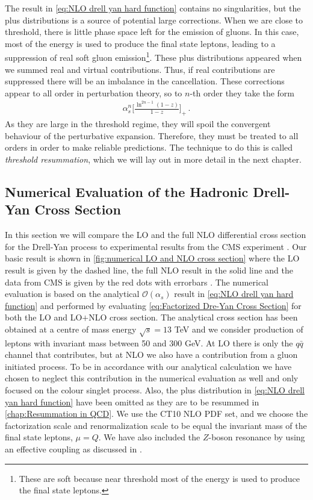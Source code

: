 The result in \cref{eq:NLO drell yan hard function} contains no singularities, but the plus distributions is a source of potential large corrections. When we are close to threshold, there is little phase space left for the emission of gluons. In this case, most of the energy is used to produce the final state leptons, leading to a suppression of real soft gluon emission\footnote{These are soft because near threshold most of the energy is used to produce the final state leptons.}. These plus distributions appeared when we summed real and virtual contributions. Thus, if real contributions are suppressed there will be an imbalance in the cancellation. These corrections appear to all order in perturbation theory, so to $n$-th order they take the form
\begin{align}
    \alpha_{s}^{n}\Big[\frac{\ln^{2n-1}(1-z)}{1-z}\Big]_{+}\,.
\end{align}
As they are large in the threshold regime, they will spoil the convergent behaviour of the perturbative expansion. Therefore, they must be treated to all orders in order to make reliable predictions. The technique to do this is called \emph{threshold resummation}, which we will lay out in more detail in the next chapter.


\subsection{Numerical Evaluation of the Hadronic Drell-Yan Cross Section}
In this section we will compare the LO and the full NLO differential cross section for the Drell-Yan process to experimental results from the CMS experiment \cite{Sirunyan:2018owv}. Our basic result is shown in \cref{fig:numerical LO and NLO cross section} where the LO result is given by the dashed line, the full NLO result in the solid line and the data from CMS is given by the red dots with errorbars \cite{Sirunyan:2018owv}. The numerical evaluation is based on the analytical $\mathcal{O}(\alpha_s)$ result in \cref{eq:NLO drell yan hard function} and performed by evaluating \cref{eq:Factorized Dre-Yan Cross Section} for both the LO and LO$+$NLO cross section. The analytical cross section has been obtained at a centre of mass energy $\sqrt{s}=13$ TeV and we consider production of leptons with invariant mass between 50 and 300 GeV. At LO there is only the $q\bar{q}$ channel that contributes, but at NLO we also have a contribution from a gluon initiated process. To be in accordance with our analytical calculation we have chosen to neglect this contribution in the numerical evaluation as well and only focused on the colour singlet process. Also, the plus distribution in \cref{eq:NLO drell yan hard function} have been omitted as they are to be resummed in \cref{chap:Resummation in QCD}. We use the CT10 NLO \cite{Lai:2010vv} PDF set, and we choose the factorization scale and renormalization scale to be equal the invariant mass of the final state leptons, $\mu=Q$. We have also included the $Z$-boson resonance by using an effective coupling as discussed in \cite{Banfi:2011dm}. 

